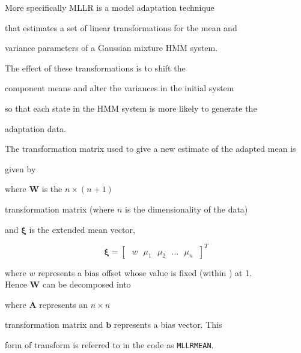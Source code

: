 More specifically MLLR is a model adaptation technique


that estimates a set of linear transformations for the mean and


variance parameters of a Gaussian mixture HMM system. 








The effect of these transformations is to shift the


component means and alter the variances in the initial system 


so that each state in the HMM system is more likely to generate the 


adaptation data.





The transformation matrix used to give a new estimate of the adapted mean is


given by




where $\bm{W}$ is the $n \times \left( n + 1 \right)$


transformation matrix (where $n$ is the dimensionality of the data)


and $\bm{\xi}$ is the extended mean vector,


\[


        \bm{\xi} = \left[\mbox{ }w\mbox{ }\mu_1\mbox{ }\mu_2\mbox{ }\dots\mbox{ }\mu_n\mbox{ }\right]^T


\]


where $w$ represents a bias offset whose value is fixed (within \HTK) at 1.\\


Hence $\bm{W}$ can be decomposed into




where $\bm{A}$ represents an $n \times n$


transformation matrix and $\bm{b}$ represents a bias vector. This


form of transform is referred to in the code as {\tt MLLRMEAN}.





